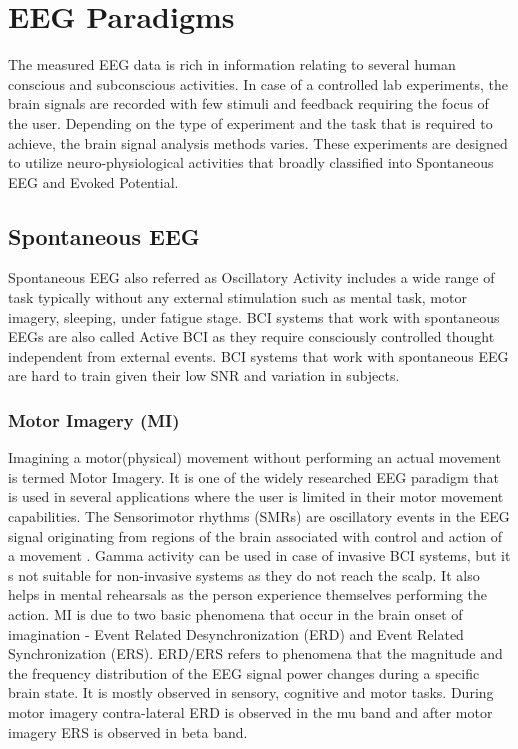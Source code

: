 \section{EEG Paradigms}
The measured EEG data is rich in information relating to several human conscious and subconscious activities. In case of a controlled lab experiments, the brain signals are recorded with few stimuli and feedback requiring the focus of the user. Depending on the type of experiment and the task that is required to achieve, the brain signal analysis methods varies. These experiments are designed to utilize neuro-physiological activities that broadly classified into Spontaneous EEG and Evoked Potential.

\subsection{Spontaneous EEG}
Spontaneous EEG also referred as Oscillatory Activity includes a wide range of task typically without any external stimulation such as mental task, motor imagery, sleeping, under fatigue stage. BCI systems that work with spontaneous EEGs are also called Active BCI as they require consciously controlled thought independent from external events. BCI systems that work with spontaneous EEG are hard to train given their low SNR and variation in subjects.

\subsubsection{Motor Imagery (MI)}
Imagining a motor(physical) movement without performing an actual movement is termed Motor Imagery. It is one of the widely researched EEG paradigm that is used in several applications where the user is limited in their motor movement capabilities. The Sensorimotor rhythms (SMRs) are oscillatory events in the EEG signal originating from regions of the brain associated with control and action of a movement \cite{2019_BMI_MIEEG}. Gamma activity can be used in case of invasive BCI systems, but it s not suitable for non-invasive systems as they do not reach the scalp. It also helps in mental rehearsals as the person experience themselves performing the action. MI is due to two basic phenomena that occur in the brain onset of imagination - Event Related Desynchronization (ERD) and Event Related Synchronization (ERS). ERD/ERS refers to phenomena that the magnitude and the frequency distribution of the EEG signal power changes during a specific brain state. It is mostly observed in sensory, cognitive and motor tasks. During motor imagery contra-lateral ERD is observed in the mu band and after motor imagery ERS is observed in beta band.

